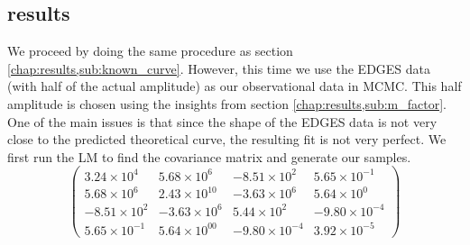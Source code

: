 \documentclass[12pt, TexShade, letterpaper]{report}
\begin{document}
\subsection{results}
We proceed by doing the same procedure as section \ref{chap:results,sub:known_curve}. However, this time we use the EDGES data (with half of the actual amplitude) as our observational data in MCMC. This half amplitude is chosen using the insights from section \ref{chap:results,sub:m_factor}. One of the main issues is that since the shape of the EDGES data is not very close to the predicted theoretical curve, the resulting fit is not very perfect. We first run the LM to find the covariance matrix and generate our samples. 
\begin{equation}
\label{eq:cov_mat_edges}
    \begin{pmatrix}
    3.24\times 10^{4} & 5.68 \times 10^{6} &  -8.51 \times 10^{2} &  5.65 \times 10^{-1} \\
    5.68 \times 10^{6} &  2.43 \times 10^{10} &  -3.63 \times 10^{6} &  5.64 \times 10^{0} \\
    -8.51 \times 10^{2} &  -3.63 \times 10^{6} &  5.44 \times 10^{2} &  -9.80 \times 10^{-4} \\
    5.65 \times 10^{-1} &  5.64\times 10^{00} &  -9.80\times 10^{-4} &  3.92 \times 10^{-5} 
    \end{pmatrix}
\end{equation}
\end{document}
